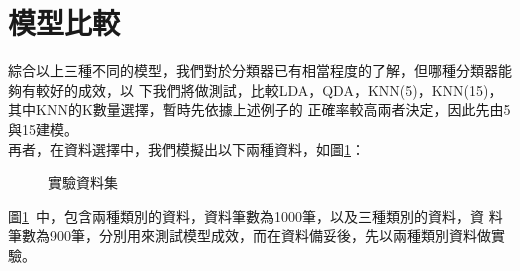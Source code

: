 	\section{模型比較}
		綜合以上三種不同的模型，我們對於分類器已有相當程度的了解，但哪種分類器能夠有較好的成效，以			下我們將做測試，比較LDA，QDA，KNN(5)，KNN(15)，其中KNN的K數量選擇，暫時先依據上述例子的			正確率較高兩者決定，因此先由5與15建模。
		\\
		再者，在資料選擇中，我們模擬出以下兩種資料，如圖\ref{fig:cmpData12}：
		\begin{figure}[H]
    		\centering      			 
       		\caption{實驗資料集}   
   			\label{fig:cmpData12}
		\end{figure}
		圖\ref{fig:cmpData12}\ 中，包含兩種類別的資料，資料筆數為1000筆，以及三種類別的資料，資			料筆數為900筆，分別用來測試模型成效，而在資料備妥後，先以兩種類別資料做實驗。
		\bigskip		
